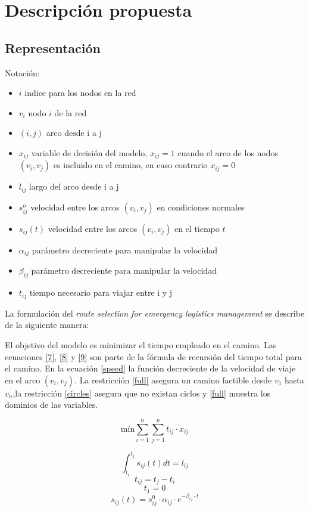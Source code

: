 \section{Descripción propuesta}
\subsection{Representación}
Notación:
\begin{itemize}
	\item $i$ indice para los nodos en la red
	\item $v_i$ nodo $i$ de la red
 	\item $(i,j)$ arco desde i a j
	\item $x_{ij}$ variable de decisión del modelo, $x_{ij} = 1 $ cuando el arco de los nodos $(v_i,v_j)$ es incluido en el camino, en caso contrario $x_{ij} = 0$
	\item $l_{ij}$ largo del arco desde i a j
	\item $s^{o}_{ij}$  velocidad entre los arcos $(v_i, v_j)$ en condiciones normales
	\item $s_{ij}(t)$ velocidad entre los arcos $(v_i, v_j)$ en el tiempo $t$
	\item $\alpha_{ij}$ parámetro decreciente para manipular la velocidad           
	\item $\beta_{ij}$ parámetro decreciente para manipular la velocidad             
	\item $t_{ij}$ tiempo necesario para viajar entre i y j                      
\end{itemize}

La formulación del \textit{route selection for emergency logistics management} se describe de la siguiente manera:

El objetivo del modelo es minimizar el tiempo empleado en el camino. Las ecuaciones \eqref{7}, \eqref{8} y \eqref{9} son parte de la fórmula de recursión del tiempo total para el camino. En la ecuación \eqref{speed} la función decreciente de la velocidad de viaje en el arco $(v_i,v_j)$. La restricción \eqref{full} asegura un camino factible desde $v_1$ hasta $v_n$,la restricción \eqref{circles} asegura que no existan ciclos y \eqref{full} muestra los dominios de las variables.

\begin{equation}
	 \text{mín} \sum_{i=1}^{n}\sum_{j=1}^{n} t_{ij} \cdot x_{ij}
\end{equation}

\begin{equation}\label{7}
  \int_{t_i}^{t_j} s_{ij}(t)dt = l_{ij}
\end{equation}
\begin{equation}\label{8}
  t_{ij} = t_j - t_i
\end{equation}
\begin{equation}\label{9}
t_1 =0
\end{equation}
\begin{equation}\label{speed}
  s_{ij}(t) = s_{ij}^0 \cdot \alpha_{ij} \cdot e^{-\beta_{ij}\cdot t}
\end{equation}

